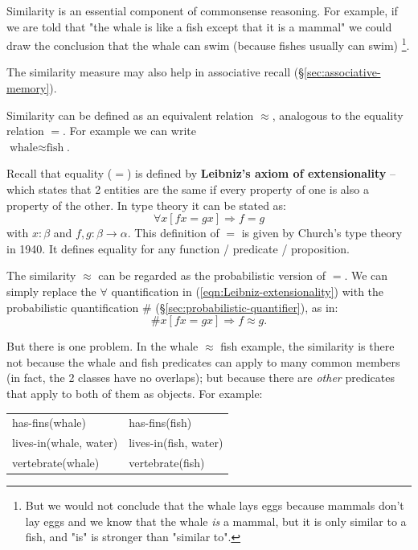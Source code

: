 Similarity is an essential component of commonsense reasoning.  For example, if we are told that "the whale is like a fish except that it is a mammal" we could draw the conclusion that the whale can swim (because fishes usually can swim) \footnote{But we would not conclude that the whale lays eggs because mammals don't lay eggs and we know that the whale \emph{is} a mammal, but it is only similar to a fish, and "is" is stronger than "similar to".}.
  
The similarity measure may also help in associative recall (\S\ref{sec:associative-memory}).

Similarity can be defined as an equivalent relation $\approx$, analogous to the equality relation $=$.  For example we can write\\
\tab $\mbox{whale} \approx \mbox{fish}$.

Recall that equality ($=$) is defined by \textbf{Leibniz's axiom of extensionality} -- which states that 2 entities are the same if every property of one is also a property of the other.  In type theory it can be stated as:
\begin{equation}
\forall x [f x = g x] \Rightarrow f = g
\label{eqn:Leibniz-extensionality}
\end{equation}
with $x : \beta$ and $f, g : \beta \rightarrow \alpha $.  This definition of $=$ is given by Church's type theory in 1940.  It defines equality for any function / predicate / proposition.

The similarity $\approx$ can be regarded as the probabilistic version of $=$.  We can simply replace the $\forall$ quantification in (\ref{eqn:Leibniz-extensionality}) with the probabilistic quantification $\#$ (\S\ref{sec:probabilistic-quantifier}), as in:
\begin{equation}
\# x [f x = g x] \Rightarrow f \approx g.
\label{eqn:probabilistic-extensionality}
\end{equation}

But there is one problem.  In the whale $\approx$ fish example, the similarity is there not because the whale and fish predicates can apply to many common members (in fact, the 2 classes have no overlaps);  but because there are \textit{other} predicates that apply to both of them as objects.  For example:

\tab \tab \tab
\begin{tabular}{l|l}
has-fins(whale)        & has-fins(fish)\\
lives-in(whale, water) & lives-in(fish, water)\\
vertebrate(whale)      & vertebrate(fish)\\
\end{tabular}

